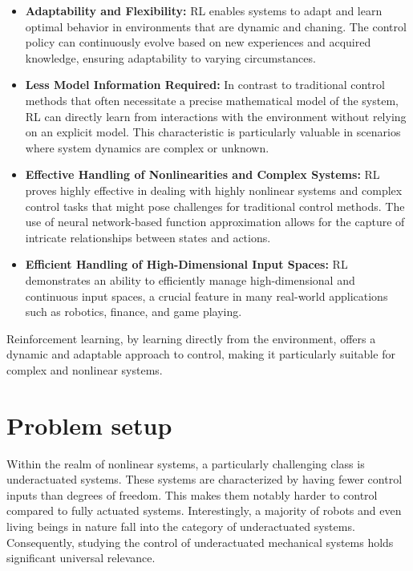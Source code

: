 \begin{itemize}
    \item \textbf{Adaptability and Flexibility:}
    RL enables systems to adapt and learn optimal behavior in environments that are dynamic and chaning. The control policy can continuously evolve based on new experiences and acquired knowledge, ensuring adaptability to varying circumstances.
    
    \item \textbf{Less Model Information Required:}
    In contrast to traditional control methods that often necessitate a precise mathematical model of the system, RL can directly learn from interactions with the environment without relying on an explicit model. This characteristic is particularly valuable in scenarios where system dynamics are complex or unknown.
    
    \item \textbf{Effective Handling of Nonlinearities and Complex Systems:}
    RL proves highly effective in dealing with highly nonlinear systems and complex control tasks that might pose challenges for traditional control methods. The use of neural network-based function approximation allows for the capture of intricate relationships between states and actions.
    
    \item \textbf{Efficient Handling of High-Dimensional Input Spaces:}
    RL demonstrates an ability to efficiently manage high-dimensional and continuous input spaces, a crucial feature in many real-world applications such as robotics, finance, and game playing.
\end{itemize}

Reinforcement learning, by learning directly from the environment, offers a dynamic and adaptable approach to control, making it particularly suitable for complex and nonlinear systems.


\section{Problem setup}
Within the realm of nonlinear systems, a particularly challenging class is underactuated systems. These systems are characterized by having fewer control inputs than degrees of freedom. This makes them notably harder to control compared to fully actuated systems. Interestingly, a majority of robots and even living beings in nature fall into the category of underactuated systems. Consequently, studying the control of underactuated mechanical systems holds significant universal relevance.

